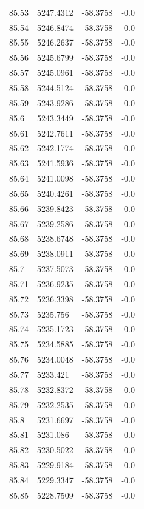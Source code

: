\begin{table}[H]
\begin{tabular}{llll}
85.53 & 5247.4312 & -58.3758 & -0.0 \\
85.54 & 5246.8474 & -58.3758 & -0.0 \\
85.55 & 5246.2637 & -58.3758 & -0.0 \\
85.56 & 5245.6799 & -58.3758 & -0.0 \\
85.57 & 5245.0961 & -58.3758 & -0.0 \\
85.58 & 5244.5124 & -58.3758 & -0.0 \\
85.59 & 5243.9286 & -58.3758 & -0.0 \\
85.6 & 5243.3449 & -58.3758 & -0.0 \\
85.61 & 5242.7611 & -58.3758 & -0.0 \\
85.62 & 5242.1774 & -58.3758 & -0.0 \\
85.63 & 5241.5936 & -58.3758 & -0.0 \\
85.64 & 5241.0098 & -58.3758 & -0.0 \\
85.65 & 5240.4261 & -58.3758 & -0.0 \\
85.66 & 5239.8423 & -58.3758 & -0.0 \\
85.67 & 5239.2586 & -58.3758 & -0.0 \\
85.68 & 5238.6748 & -58.3758 & -0.0 \\
85.69 & 5238.0911 & -58.3758 & -0.0 \\
85.7 & 5237.5073 & -58.3758 & -0.0 \\
85.71 & 5236.9235 & -58.3758 & -0.0 \\
85.72 & 5236.3398 & -58.3758 & -0.0 \\
85.73 & 5235.756 & -58.3758 & -0.0 \\
85.74 & 5235.1723 & -58.3758 & -0.0 \\
85.75 & 5234.5885 & -58.3758 & -0.0 \\
85.76 & 5234.0048 & -58.3758 & -0.0 \\
85.77 & 5233.421 & -58.3758 & -0.0 \\
85.78 & 5232.8372 & -58.3758 & -0.0 \\
85.79 & 5232.2535 & -58.3758 & -0.0 \\
85.8 & 5231.6697 & -58.3758 & -0.0 \\
85.81 & 5231.086 & -58.3758 & -0.0 \\
85.82 & 5230.5022 & -58.3758 & -0.0 \\
85.83 & 5229.9184 & -58.3758 & -0.0 \\
85.84 & 5229.3347 & -58.3758 & -0.0 \\
85.85 & 5228.7509 & -58.3758 & -0.0 \\

\end{tabular}
\end{table}
